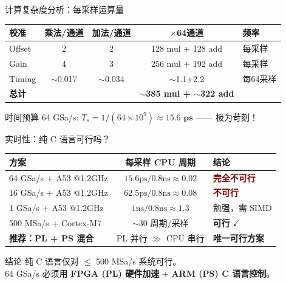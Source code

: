 \documentclass[table,UTF8,11pt,aspectratio=169]{beamer}
\begin{document}
\begin{frame}{计算复杂度分析：每采样运算量}
\small
\begin{table}
\begin{tabular}{lcccl}
\toprule
\textbf{校准} & \textbf{乘法/通道} & \textbf{加法/通道} & \textbf{$\times$64通道} & \textbf{频率} \\
\midrule
Offset  & 2 & 2 & 128 mul + 128 add & 每采样 \\
Gain    & 4 & 3 & 256 mul + 192 add & 每采样 \\
Timing  & $\sim$0.017 & $\sim$0.034 & $\sim$1.1+2.2 & 每64采样 \\
\midrule
\textbf{总计} & & & \textbf{$\sim$385 mul + $\sim$322 add} & \\
\bottomrule
\end{tabular}
\end{table}

\vspace{0.3cm}
\begin{alertblock}{时间预算}
64 GSa/s: $T_s = 1/(64\times 10^9) \approx \mathbf{15.6\text{ ps}}$ —— 极为苛刻！
\end{alertblock}
\end{frame}

\begin{frame}{实时性：纯 C 语言可行吗？}
\begin{table}
\begin{tabular}{p{3.5cm}cp{4cm}}
\toprule
\textbf{方案} & \textbf{每采样 CPU 周期} & \textbf{结论} \\
\midrule
64 GSa/s + A53 @1.2GHz & $15.6\text{ps} / 0.8\text{ns} \approx 0.02$ & \textcolor{darkred}{\textbf{完全不可行}} \\
16 GSa/s + A53 @1.2GHz & $62.5\text{ps} / 0.8\text{ns} \approx 0.08$ & \textcolor{darkred}{\textbf{不可行}} \\
1 GSa/s + A53 @1.2GHz & $1\text{ns} / 0.8\text{ns} \approx 1.3$ & 勉强，需 SIMD \\
500 MSa/s + Cortex-M7 & $\sim$30 周期/采样 & \textbf{可行} $\checkmark$ \\
\textbf{推荐：PL + PS 混合} & PL 并行 $\gg$ CPU 串行 & \textbf{唯一可行方案} \\
\bottomrule
\end{tabular}
\end{table}

\begin{block}{结论}
纯 C 语言仅对 $\le$ 500 MSa/s 系统可行。\\
64 GSa/s 必须用 \textbf{FPGA (PL) 硬件加速} + \textbf{ARM (PS) C 语言控制}。
\end{block}
\end{frame}
\end{document}
